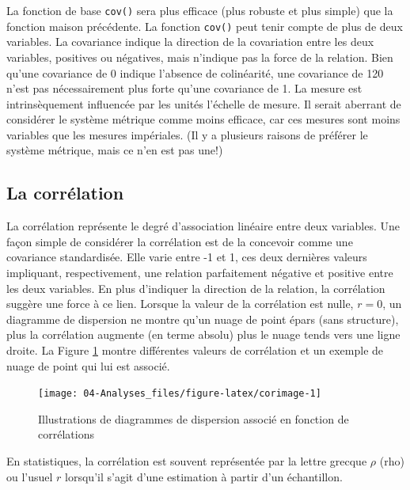 \documentclass[
]{book}
\begin{document}
La fonction de base \texttt{cov()} sera plus efficace (plus robuste et plus simple) que la fonction maison précédente. La fonction \texttt{cov()} peut tenir compte de plus de deux variables.
La covariance indique la direction de la covariation entre les deux variables, positives ou négatives, mais n'indique pas la force de la relation. Bien qu'une covariance de 0 indique l'absence de colinéarité, une covariance de 120 n'est pas nécessairement plus forte qu'une covariance de 1. La mesure est intrinsèquement influencée par les unités l'échelle de mesure. Il serait aberrant de considérer le système métrique comme moins efficace, car ces mesures sont moins variables que les mesures impériales. (Il y a plusieurs raisons de préférer le système métrique, mais ce n'en est pas une!)

\hypertarget{la-corruxe9lation}{%
\subsection{La corrélation}\label{la-corruxe9lation}}

La corrélation représente le degré d'association linéaire entre deux variables. Une façon simple de considérer la corrélation est de la concevoir comme une covariance standardisée. Elle varie entre -1 et 1, ces deux dernières valeurs impliquant, respectivement, une relation parfaitement négative et positive entre les deux variables. En plus d'indiquer la direction de la relation, la corrélation suggère une force à ce lien. Lorsque la valeur de la corrélation est nulle, \(r=0\), un diagramme de dispersion ne montre qu'un nuage de point épars (sans structure), plus la corrélation augmente (en terme absolu) plus le nuage tends vers une ligne droite. La Figure \ref{fig:corimage} montre différentes valeurs de corrélation et un exemple de nuage de point qui lui est associé.

\begin{figure}

{\centering \texttt{[image: 04-Analyses\_files/figure-latex/corimage-1]} 

}

\caption{Illustrations de diagrammes de dispersion associé en fonction de corrélations}\label{fig:corimage}
\end{figure}

En statistiques, la corrélation est souvent représentée par la lettre grecque \(\rho\) (rho) ou l'usuel \(r\) lorsqu'il s'agit d'une estimation à partir d'un échantillon.
\end{document}
